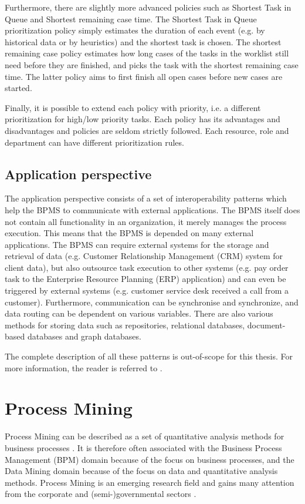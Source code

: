 
Furthermore, there are slightly more advanced policies such as Shortest Task in Queue and Shortest remaining case time. The Shortest Task in Queue prioritization policy simply estimates the duration of each event (e.g. by historical data or by heuristics) and the shortest task is chosen. The shortest remaining case policy estimates how long cases of the tasks in the worklist still need before they are finished, and picks the task with the shortest remaining case time. The latter policy aims to first finish all open cases before new cases are started. 

Finally, it is possible to extend each policy with priority, i.e. a different prioritization for high/low priority tasks. Each policy has its advantages and disadvantages and policies are seldom strictly followed. Each resource, role and department can have different prioritization rules.

\subsection{Application perspective}
The application perspective consists of a set of interoperability patterns which help the BPMS to communicate with external applications. The BPMS itself does not contain all functionality in an organization, it merely manages the process execution. This means that the BPMS is depended on many external applications. The BPMS can require external systems for the storage and retrieval of data (e.g. Customer Relationship Management (CRM) system for client data), but also outsource task execution to other systems (e.g. pay order task to the Enterprise Resource Planning (ERP) application) and can even be triggered by external systems (e.g. customer service desk received a call from a customer). Furthermore, communication can be synchronise and synchronize, and data routing can be dependent on various variables. There are also various methods for storing data such as repositories, relational databases, document-based databases and graph databases. 

The complete description of all these patterns is out-of-scope for this thesis. For more information, the reader is referred to \cite{russell2016workflow}.


\section{Process Mining} \label{sec:processmining}
Process Mining can be described as a set of quantitative analysis methods for business processes \cite{aalst2016process}. It is therefore often associated with the Business Process Management (BPM) domain \cite{aalst2013business} because of the focus on business processes, and the Data Mining domain \cite{kaufinann2006data} because of the focus on data and quantitative analysis methods. Process Mining is an emerging research field and gains many attention from the corporate and (semi-)governmental sectors \cite{aalst2011process,aalst2016process,aalst2012process}.

